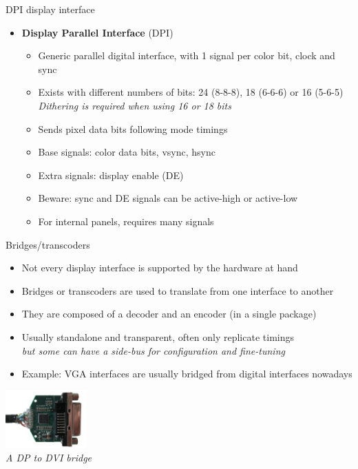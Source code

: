 \begin{frame}{DPI display interface}
  \begin{itemize}
  \item \textbf{Display Parallel Interface} (DPI)
    \begin{itemize}
    \item Generic parallel digital interface, with 1 signal per color bit, clock and sync
    \item Exists with different numbers of bits: 24 (8-8-8), 18 (6-6-6) or 16 (5-6-5)\\
    \textit{Dithering is required when using 16 or 18 bits}
    \item Sends pixel data bits following mode timings
    \item Base signals: color data bits, vsync, hsync
    \item Extra signals: display enable (DE)
    \item Beware: sync and DE signals can be active-high or active-low
    \item For internal panels, requires many signals
    \end{itemize}
  \end{itemize}
\end{frame}

\begin{frame}{Bridges/transcoders}
  \begin{itemize}
  \item Not every display interface is supported by the hardware at hand
  \item Bridges or transcoders are used to translate from one interface to another
  \item They are composed of a decoder and an encoder (in a single package)
  \item Usually standalone and transparent, often only replicate timings\\
  \textit{but some can have a side-bus for configuration and fine-tuning}
  \item Example: VGA interfaces are usually bridged from digital interfaces nowadays
  \end{itemize}

  \begin{center}
  \includegraphics[height=6em]{slides/graphics-introduction/dp-dvi-bridge.jpg}\\
  \textit{\small A DP to DVI bridge}
  \end{center}
\end{frame}

